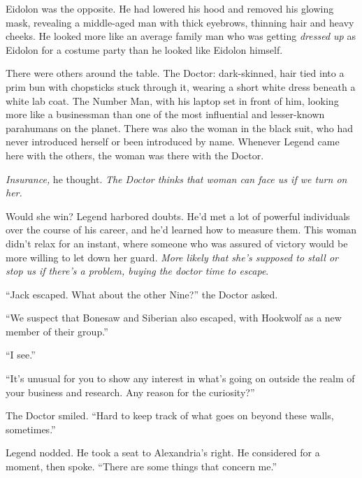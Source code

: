 Eidolon was the opposite.  He had lowered his hood and removed his glowing mask, revealing a middle-aged man with thick eyebrows, thinning hair and heavy cheeks.  He looked more like an average family man who was getting \emph{dressed up} as Eidolon for a costume party than he looked like Eidolon himself.



There were others around the table.  The Doctor: dark-skinned, hair tied into a prim bun with chopsticks stuck through it, wearing a short white dress beneath a white lab coat.  The Number Man, with his laptop set in front of him, looking more like a businessman than one of the most influential and lesser-known parahumans on the planet.  There was also the woman in the black suit, who had never introduced herself or been introduced by name.  Whenever Legend came here with the others, the woman was there with the Doctor.



\emph{Insurance,} he thought.  \emph{The Doctor thinks that woman can face us if we turn on her.}



Would she win?  Legend harbored doubts.  He'd met a lot of powerful individuals over the course of his career, and he'd learned how to measure them.  This woman didn't relax for an instant, where someone who was assured of victory would be more willing to let down her guard.  \emph{More likely that she's supposed to stall or stop us if there's a problem, buying the doctor time to escape}.



``Jack escaped.  What about the other Nine?'' the Doctor asked.



``We suspect that Bonesaw and Siberian also escaped, with Hookwolf as a new member of their group.''



``I see.''



``It's unusual for you to show any interest in what's going on outside the realm of your business and research.  Any reason for the curiosity?''



The Doctor smiled. ``Hard to keep track of what goes on beyond these walls, sometimes.''



Legend nodded.  He took a seat to Alexandria's right.  He considered for a moment, then spoke.  ``There are some things that concern me.''




